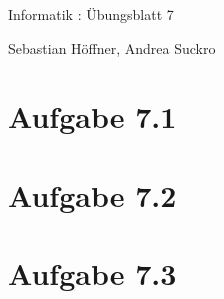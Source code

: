 \documentclass{article}
\begin{document}
\begin{center}
  \Large{Informatik \revD: Übungsblatt 7}

  \large{Sebastian Höffner, Andrea Suckro}
\end{center}



\section*{Aufgabe 7.1}


\section*{Aufgabe 7.2}



\section*{Aufgabe 7.3}
\end{document}
